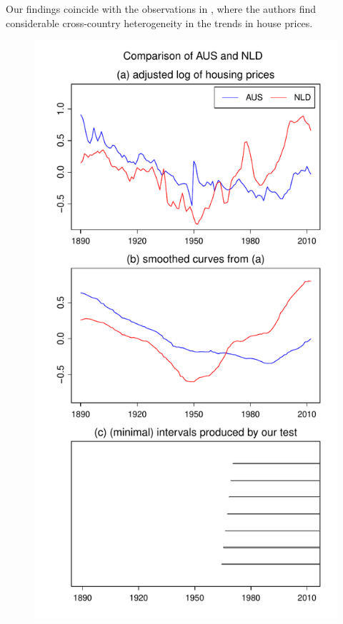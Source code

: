 \documentclass[a4paper,12pt]{article}
\begin{document}
Our findings coincide with the observations in \cite{Knoll2017}, where the authors find considerable cross-country heterogeneity in the trends in house prices.

\begin{figure}[p!]
\begin{minipage}[t]{0.49\textwidth}
\includegraphics[width=\textwidth]{Plots/hp_AUS_vs_NLD}

\end{minipage}
\end{figure}
\end{document}
